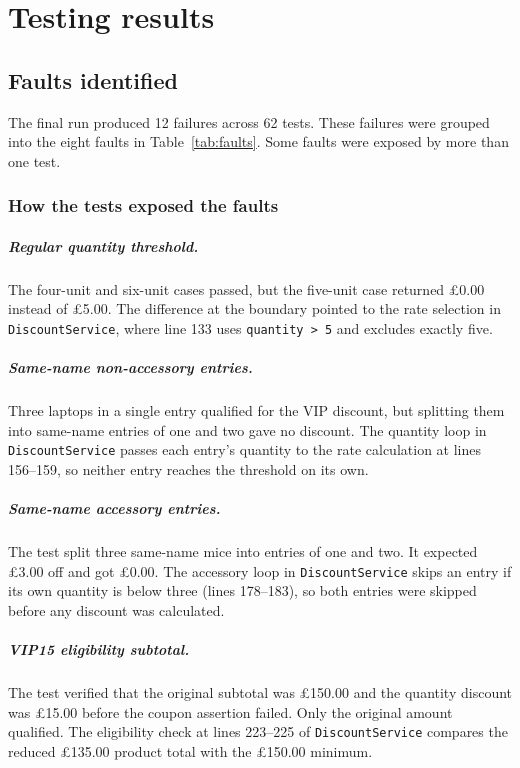 \chapter{Testing results}
\label{chap:testing}

\section{Faults identified}
The final run produced 12 failures across 62 tests. These failures
were grouped into the eight faults in Table~\ref{tab:faults}. Some
faults were exposed by more than one test.



\subsection{How the tests exposed the faults}
\paragraph{Regular quantity threshold.}
The four-unit and six-unit cases passed, but the five-unit case returned
\pounds0.00 instead of \pounds5.00. The difference at the boundary
pointed to the rate selection in \texttt{DiscountService}, where
line 133 uses \texttt{quantity > 5} and excludes exactly five.

\paragraph{Same-name non-accessory entries.}
Three laptops in a single entry qualified for the VIP discount, but
splitting them into same-name entries of one and two gave no discount.
The quantity loop in \texttt{DiscountService} passes each entry's
quantity to the rate calculation at lines 156--159, so neither entry
reaches the threshold on its own.

\paragraph{Same-name accessory entries.}
The test split three same-name mice into entries of one and two.
It expected \pounds3.00 off and got \pounds0.00. The accessory loop
in \texttt{DiscountService} skips an entry if its own quantity is below
three (lines 178--183), so both entries were skipped before any
discount was calculated.

\paragraph{VIP15 eligibility subtotal.}
The test verified that the original subtotal was \pounds150.00 and the
quantity discount was \pounds15.00 before the coupon assertion failed.
Only the original amount qualified. The eligibility check at lines
223--225 of \texttt{DiscountService} compares the reduced
\pounds135.00 product total with the \pounds150.00 minimum.


